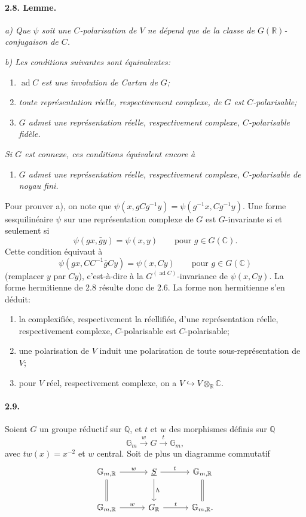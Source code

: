 \documentclass[10pt]{article}
\newcommand{\C}{\mathbb{C}}
\newcommand{\Q}{\mathbb{Q}}
\newcommand{\R}{\mathbb{R}}
\newcommand{\Gm}{\mathbb{G}_m}
\newcommand{\ad}{\operatorname{ad}}
\newcommand{\into}{\hookrightarrow}
\begin{document}
\paragraph{2.8. Lemme.} \emph{a) Que $\psi$ soit une $C$-polarisation de $V$ ne dépend que de la classe de $G(\R)$-conjugaison de $C$.}

\emph{b) Les conditions suivantes sont équivalentes:}
\begin{enumerate}[label=(\roman*)]
\item \emph{$\ad C$ est une involution de Cartan de $G$;}
\item \emph{toute représentation réelle, respectivement complexe, de $G$ est $C$-polarisable;}
\item \emph{$G$ admet une représentation réelle, respectivement complexe, $C$-polarisable fidèle.}
\end{enumerate}
\emph{Si $G$ est connexe, ces conditions équivalent encore à}
\begin{enumerate}[label=(iii\textquotesingle)]
\item \emph{$G$ admet une représentation réelle, respectivement complexe, $C$-polarisable de noyau fini.}
\end{enumerate}

Pour prouver a), on note que $\psi(x,gCg^{-1}y)=\psi(g^{-1}x,Cg^{-1}y)$. Une forme sesquilinéaire $\psi$ sur une représentation complexe de $G$ est $G$-invariante si et seulement si
\[
\psi(gx,\bar g y)=\psi(x,y)\qquad\text{pour }g\in G(\C).
\]
Cette condition équivaut à
\[
\psi(gx,CC^{-1}\bar g Cy)=\psi(x,Cy)\qquad\text{pour }g\in G(\C)
\]
(remplacer $y$ par $Cy$), c'est-à-dire à la $G^{(\ad C)}$-invariance de $\psi(x,Cy)$. La forme hermitienne de 2.8 résulte donc de 2.6. La forme non hermitienne s'en déduit:
\begin{enumerate}[label=\alph*)]
\item la complexifiée, respectivement la réellifiée, d'une représentation réelle, respectivement complexe, $C$-polarisable est $C$-polarisable;
\item une polarisation de $V$ induit une polarisation de toute sous-représentation de $V$;
\item pour $V$ réel, respectivement complexe, on a $V\into V\otimes_\R\C$.
\end{enumerate}

\paragraph{2.9.} Soient $G$ un groupe réductif sur $\Q$, et $t$ et $w$ des morphismes définis sur $\Q$
\[
\Gm \xrightarrow{\ w\ } G \xrightarrow{\ t\ } \Gm,
\]
avec $tw(x)=x^{-2}$ et $w$ central. Soit de plus un diagramme commutatif
\[
\begin{tikzcd}[column sep=3em,row sep=2.6em]
\mathbb G_{m,\R} \arrow[r,"w"] \arrow[d,equal] & \underline S \arrow[r,"t"] \arrow[d,"h"] & \mathbb G_{m,\R} \arrow[d,equal]\\
\mathbb G_{m,\R} \arrow[r,"w"] & G_\R \arrow[r,"t"] & \mathbb G_{m,\R}.
\end{tikzcd}
\]
\end{document}

